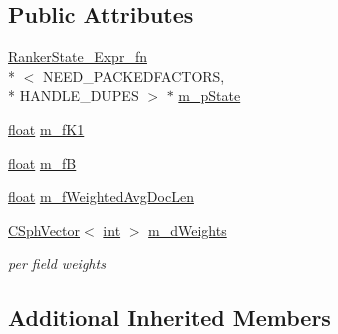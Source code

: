 \subsection*{Public Attributes}
\begin{DoxyCompactItemize}
\item 
\hyperlink{structRankerState__Expr__fn}{Ranker\-State\-\_\-\-Expr\-\_\-fn}\\*
$<$ N\-E\-E\-D\-\_\-\-P\-A\-C\-K\-E\-D\-F\-A\-C\-T\-O\-R\-S, \\*
H\-A\-N\-D\-L\-E\-\_\-\-D\-U\-P\-E\-S $>$ $\ast$ \hyperlink{structExpr__BM25F__T_acbdbcebc2b54b055689f57dbb90000bd}{m\-\_\-p\-State}
\item 
\hyperlink{sphinxexpr_8cpp_a0e0d0739f7035f18f949c2db2c6759ec}{float} \hyperlink{structExpr__BM25F__T_a88d506a5018b8563022d03d74de73835}{m\-\_\-f\-K1}
\item 
\hyperlink{sphinxexpr_8cpp_a0e0d0739f7035f18f949c2db2c6759ec}{float} \hyperlink{structExpr__BM25F__T_aff3a86f844010e800cb1e6532b1950d4}{m\-\_\-f\-B}
\item 
\hyperlink{sphinxexpr_8cpp_a0e0d0739f7035f18f949c2db2c6759ec}{float} \hyperlink{structExpr__BM25F__T_a7120d82bc4cdf4e645b8ff0148fcd0d5}{m\-\_\-f\-Weighted\-Avg\-Doc\-Len}
\item 
\hyperlink{classCSphVector}{C\-Sph\-Vector}$<$ \hyperlink{sphinxexpr_8cpp_a4a26e8f9cb8b736e0c4cbf4d16de985e}{int} $>$ \hyperlink{structExpr__BM25F__T_a1a2b62998219158e109779220a342a4c}{m\-\_\-d\-Weights}
\begin{DoxyCompactList}\small\item\em per field weights \end{DoxyCompactList}\end{DoxyCompactItemize}
\subsection*{Additional Inherited Members}


